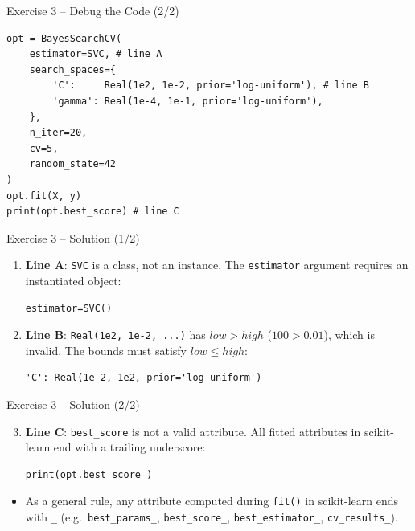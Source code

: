 \documentclass{beamer}
\begin{document}
\begin{frame}[fragile]{Exercise 3 -- Debug the Code (2/2)}
  \begin{lstlisting}
opt = BayesSearchCV(
    estimator=SVC, # line A
    search_spaces={
        'C':     Real(1e2, 1e-2, prior='log-uniform'), # line B
        'gamma': Real(1e-4, 1e-1, prior='log-uniform'),
    },
    n_iter=20,
    cv=5,
    random_state=42
)
opt.fit(X, y)
print(opt.best_score) # line C
  \end{lstlisting}
\end{frame}

\begin{frame}[fragile]{Exercise 3 -- Solution (1/2)}
  \begin{enumerate}
    \item \textbf{Line A}: \texttt{SVC} is a class, not an instance.
    The \texttt{estimator} argument requires an instantiated object:
    \begin{lstlisting}
estimator=SVC()
    \end{lstlisting}
    \item \textbf{Line B}: \texttt{Real(1e2, 1e-2, ...)} has \(low > high\) (\(100 > 0.01\)), which is invalid.
    The bounds must satisfy \(low \leq high\):
    \begin{lstlisting}
'C': Real(1e-2, 1e2, prior='log-uniform')
    \end{lstlisting}
  \end{enumerate}
\end{frame}

\begin{frame}[fragile]{Exercise 3 -- Solution (2/2)}
  \begin{enumerate}
    \setcounter{enumi}{2}
    \item \textbf{Line C}: \texttt{best\_score} is not a valid attribute.
    All fitted attributes in scikit-learn end with a trailing underscore:
    \begin{lstlisting}
print(opt.best_score_)
    \end{lstlisting}
  \end{enumerate}
  \begin{itemize}
    \item As a general rule, any attribute computed during \texttt{fit()} in scikit-learn ends with \texttt{\_} (e.g.\ \texttt{best\_params\_}, \texttt{best\_score\_}, \texttt{best\_estimator\_}, \texttt{cv\_results\_}).
  \end{itemize}
\end{frame}
\end{document}
